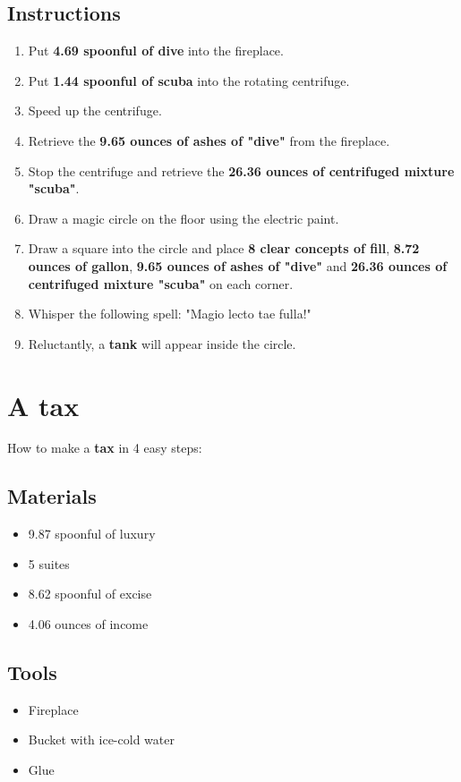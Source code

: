 \documentclass{article}
\begin{document}
\subsection{Instructions}\begin{enumerate}
\item 
Put \textbf{4.69 spoonful of dive} into the fireplace.
\item 
Put \textbf{1.44 spoonful of scuba} into the rotating centrifuge.
\item 
Speed up the centrifuge.
\item 
Retrieve the \textbf{9.65 ounces of ashes of "dive"} from the fireplace.
\item 
Stop the centrifuge and retrieve the \textbf{26.36 ounces of centrifuged mixture "scuba"}.
\item 
Draw a magic circle on the floor using the electric paint.
\item 
Draw a square into the circle and place \textbf{8 clear concepts of fill}, \textbf{8.72 ounces of gallon}, \textbf{9.65 ounces of ashes of "dive"} and \textbf{26.36 ounces of centrifuged mixture "scuba"} on each corner.
\item 
Whisper the following spell: "Magio lecto tae fulla!"
\item 
Reluctantly, a \textbf{tank} will appear inside the circle.
\end{enumerate}
\newpage
\section{A tax}How to make a \textbf{tax} in 4 easy steps:

\subsection{Materials}\begin{itemize}
\item 
9.87 spoonful of luxury
\item 
5 suites
\item 
8.62 spoonful of excise
\item 
4.06 ounces of income
\end{itemize}
\subsection{Tools}\begin{itemize}
\item 
Fireplace
\item 
Bucket with ice-cold water
\item 
Glue
\end{itemize}
\end{document}
